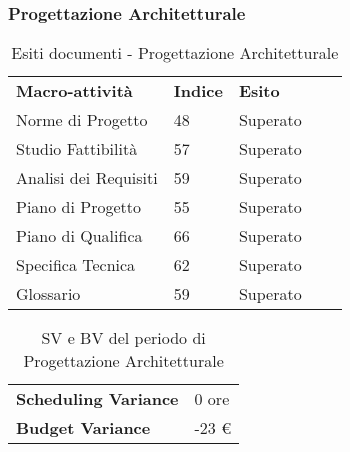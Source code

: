 \subsubsection{Progettazione Architetturale}
\begin{table}[H]
			\centering
				\begin{tabular}{|l|l|l|ll}
					\cline{1-3}
					 \textbf{Macro-attività}  & \textbf{Indice \glossaryItem{Gulpease}}  & \textbf{Esito}  &  \\ \cline{1-3}
					 Norme di Progetto & 48 & Superato &  \\ \cline{1-3}
					 Studio Fattibilità & 57 & Superato &  \\ \cline{1-3}
					 Analisi dei Requisiti & 59 & Superato &  \\ \cline{1-3}
					 Piano di Progetto & 55 & Superato &  \\ \cline{1-3}
					 Piano di Qualifica & 66 & Superato &  \\ \cline{1-3}
					 Specifica Tecnica & 62 & Superato & \\ \cline{1-3}
					 Glossario & 59 & Superato &  \\ \cline{1-3}
				\end{tabular}
				\caption{Esiti  documenti - Progettazione Architetturale}
		\end{table}
		\begin{table}[H]
		\centering
		\begin{tabular}{|l|l|}
		\cline{1-2}
		\textbf{Scheduling Variance} & 0 ore \\ \cline{1-2}
		\textbf{Budget Variance} & -23 \euro{} \\ \cline{1-2}
		\end{tabular}
		\caption{SV e BV del periodo di Progettazione Architetturale}
		\end{table}

 
